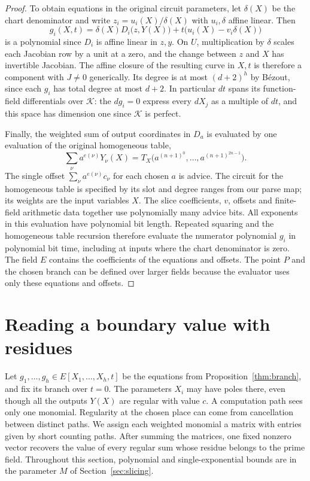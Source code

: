 \documentclass[11pt,letterpaper]{article}
\theoremstyle{definition}
\numberwithin{equation}{section}
\begin{document}
\begin{proof}
To obtain equations in the original circuit parameters, let $\delta(X)$ be the chart denominator
and write $z_i=u_i(X)/\delta(X)$ with $u_i,\delta$ affine linear. Then
\[
  g_i(X,t) = \delta(X)D_i\bigl(z,Y(X)\bigr) + t\bigl(u_i(X)-v_i\delta(X)\bigr)
\]
is a polynomial since $D_i$ is affine linear in $z,y$. On $U$, multiplication by $\delta$ scales each Jacobian
row by a unit at a zero, and the change between $z$ and $X$ has invertible Jacobian. The
affine closure of the resulting curve in $X,t$ is therefore a component with $J\ne 0$ generically.
Its degree is at most $(d+2)^h$ by Bézout, since each $g_i$ has total degree at most $d+2$. In
particular $dt$ spans its function-field differentials over $\mathcal{K}$: the $dg_i=0$ express every $dX_j$ as a
multiple of $dt$, and this space has dimension one since $\mathcal{K}$ is perfect.

Finally, the weighted sum of output coordinates in $D_a$ is evaluated by one evaluation of
the original homogeneous table,
\[
  \sum_\nu a^{e(\nu)}Y_\nu(X) = T_X\bigl(a^{(n+1)^0},\ldots,a^{(n+1)^{2n-1}}\bigr).
\]
The single offset $\sum_\nu a^{e(\nu)}c_\nu$ for each chosen $a$ is advice. The circuit for the homogeneous
table is specified by its slot and degree ranges from our parse map; its weights are the input
variables $X$. The slice coefficients, $v$, offsets and finite-field arithmetic data together use
polynomially many advice bits. All exponents in this evaluation have polynomial bit length.
Repeated squaring and the homogeneous table recursion therefore evaluate the numerator
polynomial $g_i$ in polynomial bit time, including at inputs where the chart denominator is
zero. The field $E$ contains the coefficients of the equations and offsets. The point $P$ and
the chosen branch can be defined over larger fields because the evaluator uses only these
equations and offsets.
\end{proof}

\section{Reading a boundary value with residues}\label{sec:residues}

Let $g_1,\ldots,g_h \in E[X_1,\ldots,X_h,t]$ be the equations from Proposition~\ref{thm:branch}, and fix its branch
over $t=0$. The parameters $X_i$ may have poles there, even though all the outputs $Y(X)$
are regular with value $c$. A computation path sees only one monomial. Regularity at the
chosen place can come from cancellation between distinct paths. We assign each weighted
monomial a matrix with entries given by short counting paths. After summing the matrices,
one fixed nonzero vector recovers the value of every regular sum whose residue belongs to
the prime field. Throughout this section, polynomial and single-exponential bounds are in
the parameter $M$ of Section~\ref{sec:slicing}.
\end{document}
